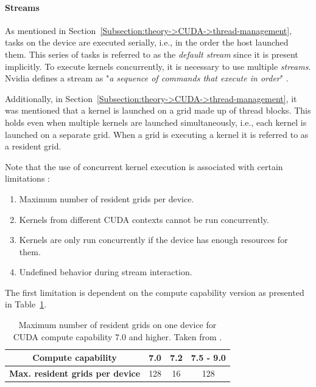 \paragraph{Streams} As mentioned in Section~\ref{Subsection:theory->CUDA->thread-management}, tasks on the device are executed serially, i.e., in the order the host launched them.
This series of tasks is referred to as the \textit{default stream} since it is present implicitly.
To execute kernels concurrently, it is necessary to use multiple \textit{streams}.
Nvidia defines a stream as "\textit{a sequence of commands that execute in order}" \cite{NVIDIADecember2022}.

Additionally, in Section~\ref{Subsection:theory->CUDA->thread-management}, it was mentioned that a kernel is launched on a grid made up of thread blocks.
This holds even when multiple kernels are launched simultaneously, i.e., each kernel is launched on a separate grid.
When a grid is executing a kernel it is referred to as a resident grid.

Note that the use of concurrent kernel execution is associated with certain limitations \cite{Cejka2022, NVIDIADecember2022}:

\begin{enumerate}
	\item Maximum number of resident grids per device.
	\item Kernels from different CUDA contexts cannot be run concurrently.
	\item Kernels are only run concurrently if the device has enough resources for them.
	\item Undefined behavior during stream interaction.
\end{enumerate}

The first limitation is dependent on the compute capability version as presented in Table~\ref{Table:theory->CUDA->concurrent-kernel-execution->maximum-resident-grids-per-device}.

\begin{table}[ht!]
	\centering
	\begin{tabular}{|c|c|c|c|}
		\hline
		\cellcolor[HTML]{C0C0C0}\textbf{Compute capability}             & 7.0 & 7.2 & 7.5 - 9.0 \\ \hline
		\cellcolor[HTML]{C0C0C0}\textbf{Max. resident grids per device} & 128 & 16  &    128    \\ \hline
	\end{tabular}
	\caption{Maximum number of resident grids on one device for CUDA compute capability 7.0 and higher.
		Taken from  \cite{NVIDIADecember2022}.
	}
	\label{Table:theory->CUDA->concurrent-kernel-execution->maximum-resident-grids-per-device}
\end{table}

